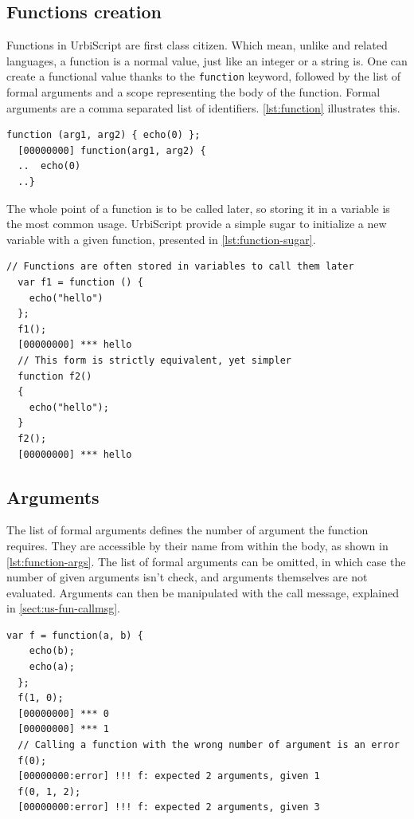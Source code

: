 \documentclass[openright,twoside,12pt]{report}
\newcommand{\us}{UrbiScript\xspace}
\newcommand   {\floatpos}          {htbp}
\newcommand{\lst}[1]{\autoref{lst:#1}}
\newcommand{\sect}[1]{\autoref{sect:#1}}
\begin{document}
\subsection{Functions creation}

Functions in \us are first class citizen. Which mean, unlike \C and
related languages, a function is a normal value, just like an integer
or a string is. One can create a functional value thanks to the
\lstinline|function| keyword, followed by the list of formal arguments
and a scope representing the body of the function. Formal arguments
are a comma separated list of identifiers. \lst{function} illustrates
this.

\begin{lstlisting}[caption=Functional
  value,label=lst:function,float=\floatpos]
  function (arg1, arg2) { echo(0) };
  [00000000] function(arg1, arg2) {
  ..  echo(0)
  ..}
\end{lstlisting}

The whole point of a function is to be called later, so storing it in
a variable is the most common usage. \us provide a simple sugar to
initialize a new variable with a given function, presented in
\lst{function-sugar}.

\begin{lstlisting}[caption=Storing functions in variables,
  label=lst:function-sugar,float=\floatpos]
  // Functions are often stored in variables to call them later
  var f1 = function () {
    echo("hello")
  };
  f1();
  [00000000] *** hello
  // This form is strictly equivalent, yet simpler
  function f2()
  {
    echo("hello");
  }
  f2();
  [00000000] *** hello
\end{lstlisting}

\subsection{Arguments}

The list of formal arguments defines the number of argument the
function requires. They are accessible by their name from within the
body, as shown in \lst{function-args}. The list of formal arguments
can be omitted, in which case the number of given arguments isn't
check, and arguments themselves are not evaluated. Arguments can then
be manipulated with the call message, explained in
\sect{us-fun-callmsg}.

\begin{lstlisting}[caption=Storing and calling
  functions,label=lst:function-args,float=\floatpos]
  var f = function(a, b) {
    echo(b);
    echo(a);
  };
  f(1, 0);
  [00000000] *** 0
  [00000000] *** 1
  // Calling a function with the wrong number of argument is an error
  f(0);
  [00000000:error] !!! f: expected 2 arguments, given 1
  f(0, 1, 2);
  [00000000:error] !!! f: expected 2 arguments, given 3
\end{lstlisting}
\end{document}
